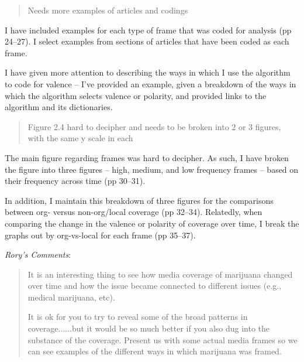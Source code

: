\documentclass[12pt,stdletter,dateno,sigleft]{newlfm} %
\begin{document}
\begin{newlfm}
\begin{quotation}{\color{red}\noindent \footnotesize
Needs more examples of articles and codings
}
\end{quotation}

I have included examples for each type of frame that was coded for analysis (pp 24--27). I select examples from sections of articles that have been coded as each frame. 

I have given more attention to describing the ways in which I use the algorithm to code for valence -- I've provided an example, given a breakdown of the ways in which the algorithm selects valence or polarity, and provided links to the algorithm and its dictionaries. 





\begin{quotation}{\color{red}\noindent \footnotesize
Figure 2.4 hard to decipher and needs to be broken into 2 or 3 figures, with the same y scale in each
}
\end{quotation}

The main figure regarding frames was hard to decipher. As such, I have broken the figure into three figures -- high, medium, and low frequency frames -- based on their frequency across time (pp 30--31). 

In addition, I maintain this breakdown of three figures for the comparisons between org- versus non-org/local coverage (pp 32--34). Relatedly, when comparing the change in the valence or polarity of coverage over time, I break the graphs out by org-vs-local for each frame (pp 35--37).\newline


\textit{Rory's Comments}:

\begin{quotation}{\color{red}\noindent \footnotesize
It is an interesting thing to see how media coverage of marijuana changed over time and how the issue became connected to different issues (e.g., medical marijuana, etc). \newline

\noindent It is ok for you to try to reveal some of the broad patterns in coverage......but it would be so much better if you also dug into the substance of the coverage.  Present us with some actual media frames so we can see examples of the different ways in which marijuana was framed.
}
\end{quotation}





\end{newlfm}
\end{document}
